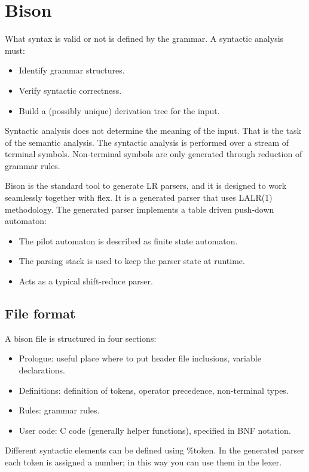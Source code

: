 \section{Bison}

What syntax is valid or not is defined by the grammar. A syntactic analysis must:
\begin{itemize}
    \item Identify grammar structures.
    \item Verify syntactic correctness.
    \item Build a (possibly unique) derivation tree for the input.
\end{itemize}
Syntactic analysis does not determine the meaning of the input. That is the task of the semantic analysis. The syntactic analysis is performed over a stream of
terminal symbols. Non-terminal symbols are only generated through reduction of grammar rules. 

Bison is the standard tool to generate LR parsers, and it is designed to work seamlessly together with flex. It is a generated parser that uses LALR(1) methodology.
The generated parser implements a table driven push-down automaton:
\begin{itemize}
    \item The pilot automaton is described as finite state automaton.
    \item The parsing stack is used to keep the parser state at runtime.
    \item Acts as a typical shift-reduce parser.
\end{itemize}

\subsection*{File format}
A bison file is structured in four sections:
\begin{itemize}
    \item Prologue: useful place where to put header file inclusions, variable declarations. 
    \item Definitions: definition of tokens, operator precedence, non-terminal types. 
    \item Rules: grammar rules. 
    \item User code: C code (generally helper functions), specified in BNF notation.
\end{itemize}
Different syntactic elements can be defined using $\%$token. In the generated parser each token is assigned a number; in this way you can use them in the lexer. 

